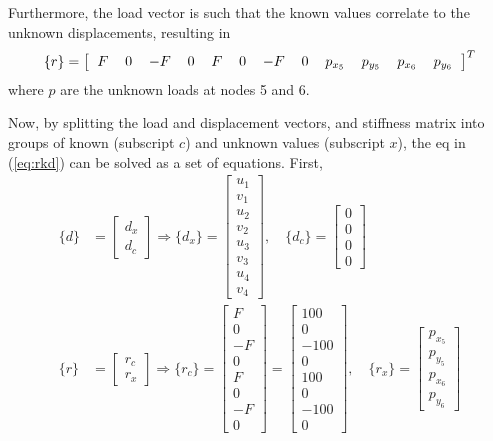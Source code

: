 \documentclass{article}
\begin{document}
\begin{enumerate}
Furthermore, the load vector is such that the known values correlate to the unknown displacements, resulting in
\begin{align}
\{r\} =	
\left[\begin{tabular}{cccccccccccc}
		$F$ & 0 & $-F$ & 0 & $F$ & 0 & $-F$ & 0 & $p_{x_5}$ & $p_{y_5}$ & $p_{x_6}$ & $p_{y_6}$ 
\end{tabular}\right]^T
\end{align}
where $p$ are the unknown loads at nodes 5 and 6. 

Now, by splitting the load and displacement vectors, and stiffness matrix into groups of known (subscript $c$) and unknown values (subscript $x$), the eq in (\ref{eq:rkd}) can be solved as a set of equations. First, 
\begin{align}
	\{d\} &= \begin{bmatrix} d_x \\ d_c \end{bmatrix} \Rightarrow \{d_x\} = \begin{bmatrix} u_1\\ v_1\\ u_2\\ v_2\\ u_3\\ v_3\\ u_4\\ v_4  \end{bmatrix}, \quad \{d_c\} = \begin{bmatrix} 0 \\ 0 \\ 0 \\ 0 \end{bmatrix}  \\
	\{r\} &= \begin{bmatrix} r_c \\ r_x \end{bmatrix} \Rightarrow \{r_c\} = \begin{bmatrix} F \\ 0 \\ -F \\ 0 \\ F \\ 0 \\ -F \\ 0 \end{bmatrix} = \begin{bmatrix} 100 \\ 0 \\ -100 \\ 0 \\ 100 \\ 0 \\ -100 \\ 0 \end{bmatrix} , \quad \{r_x\} = \begin{bmatrix} p_{x_5} \\ p_{y_5} \\ p_{x_6} \\ p_{y_6} \end{bmatrix}  

\end{align}
\end{enumerate}
\end{document}
